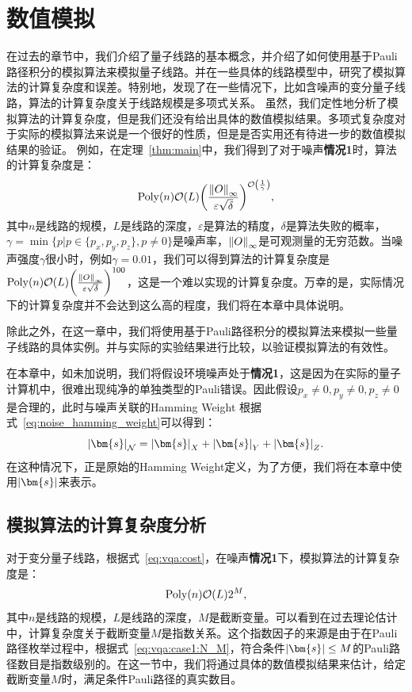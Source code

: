 \chapter{数值模拟}

在过去的章节中，我们介绍了量子线路的基本概念，并介绍了如何使用基于Pauli路径积分的模拟算法来模拟量子线路。并在一些具体的线路模型中，研究了模拟算法的计算复杂度和误差。特别地，发现了在一些情况下，比如含噪声的变分量子线路，算法的计算复杂度关于线路规模是多项式关系。
虽然，我们定性地分析了模拟算法的计算复杂度，但是我们还没有给出具体的数值模拟结果。多项式复杂度对于实际的模拟算法来说是一个很好的性质，但是是否实用还有待进一步的数值模拟结果的验证。
例如，在定理~\ref{thm:main}中，我们得到了对于噪声\textbf{情况1}时，算法的计算复杂度是：
\begin{equation*}
    \mathrm{Poly}(n) \order{L} \bigg(\frac{\norm{O}_\infty}{\varepsilon \sqrt{\delta}} \bigg)^{\order{\frac{1}{\gamma}}},
\end{equation*}
其中$n$是线路的规模，$L$是线路的深度，$\varepsilon$是算法的精度，$\delta$是算法失败的概率，$\gamma=\min\{p|{p \in \{p_x,p_y,p_z\},p\neq 0}\}$是噪声率，$\norm{O}_\infty$是可观测量的无穷范数。当噪声强度$\gamma$很小时，例如$\gamma=0.01$，我们可以得到算法的计算复杂度是$\mathrm{Poly}(n) \order{L} \bigg(\frac{\norm{O}_\infty}{\varepsilon \sqrt{\delta}} \bigg)^{{100}}$，这是一个难以实现的计算复杂度。万幸的是，实际情况下的计算复杂度并不会达到这么高的程度，我们将在本章中具体说明。

除此之外，在这一章中，我们将使用基于Pauli路径积分的模拟算法来模拟一些量子线路的具体实例。并与实际的实验结果进行比较，以验证模拟算法的有效性。

在本章中，如未加说明，我们将假设环境噪声处于\textbf{情况1}，这是因为在实际的量子计算机中，很难出现纯净的单独类型的Pauli错误。因此假设$p_x\neq 0,p_y\neq 0,p_z\neq 0$是合理的，此时与噪声关联的Hamming Weight 根据式~\eqref{eq:noise_hamming_weight}可以得到：
\begin{equation*}
    \abs{\bm{s}}_{\mathcal{N}}=\abs{\bm{s}}_X + \abs{\bm{s}}_Y + \abs{\bm{s}}_Z.
\end{equation*}
在这种情况下，正是原始的Hamming Weight定义，为了方便，我们将在本章中使用$\abs{\bm{s}}$来表示。


\section{模拟算法的计算复杂度分析}
对于变分量子线路，根据式~\eqref{eq:vqa:cost}，在噪声\textbf{情况1}下，模拟算法的计算复杂度是：
\begin{equation*}
    \mathrm{Poly}(n) \order{L}2^M,
\end{equation*}
其中$n$是线路的规模，$L$是线路的深度，$M$是截断变量。可以看到在过去理论估计中，计算复杂度关于截断变量$M$是指数关系。这个指数因子的来源是由于在Pauli 路径枚举过程中，根据式~\eqref{eq:vqa:case1:N_M}，符合条件$\abs{\bm{s}}\leq M$的Pauli路径数目是指数级别的。在这一节中，我们将通过具体的数值模拟结果来估计，给定截断变量$M$时，满足条件Pauli路径的真实数目。


